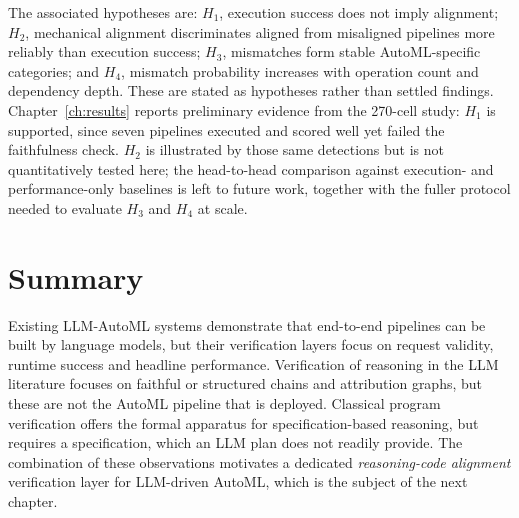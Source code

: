 The associated hypotheses are: $H_1$, execution success does not
imply alignment; $H_2$, mechanical alignment discriminates aligned
from misaligned pipelines more reliably than execution success;
$H_3$, mismatches form stable AutoML-specific categories; and
$H_4$, mismatch probability increases with operation count and
dependency depth. These are stated as hypotheses rather than settled
findings. Chapter~\ref{ch:results} reports preliminary evidence from
the 270-cell study: $H_1$ is supported, since seven pipelines
executed and scored well yet failed the faithfulness check. $H_2$ is
illustrated by those same detections but is not quantitatively tested
here; the head-to-head comparison against execution- and
performance-only baselines is left to future work, together with the
fuller protocol needed to evaluate $H_3$ and $H_4$ at scale.

\section{Summary}

Existing LLM-AutoML systems demonstrate that end-to-end
pipelines can be built by language models, but their verification
layers focus on request validity, runtime success and headline
performance. Verification of reasoning in the LLM literature
focuses on faithful or structured chains and attribution graphs,
but these are not the AutoML pipeline that is deployed. Classical
program verification offers the formal apparatus for
specification-based reasoning, but requires a specification, which
an LLM plan does not readily provide. The combination of these
observations motivates a dedicated \emph{reasoning-code alignment}
verification layer for LLM-driven AutoML, which is the subject of
the next chapter.
